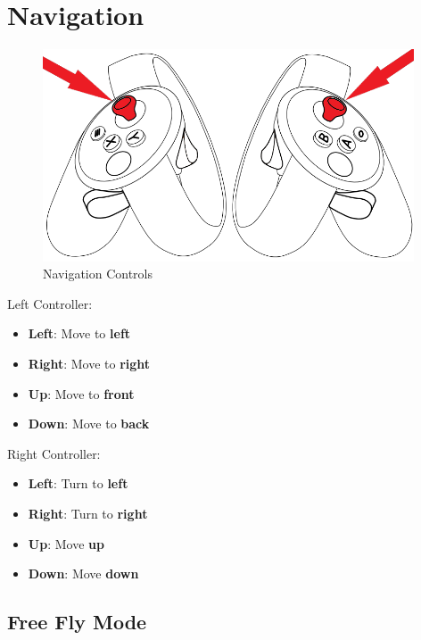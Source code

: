 \documentclass[notitlepage]{article}
\begin{document}
\section{Navigation}
\begin{figure}[H]
   \centering
	\includegraphics[width=11cm]{Controllers_sticks}%
    \caption{Navigation Controls}\label{fig:LeftRightSticks}%
\end{figure}

\begin{center}
\begin{varwidth}[t]{.5\textwidth}
Left Controller:
\begin{itemize}
\item \textbf{Left}: Move to \textbf{left}
\item \textbf{Right}: Move to \textbf{right}
\item \textbf{Up}: Move to \textbf{front}
\item \textbf{Down}: Move to \textbf{back}
\end{itemize}
\end{varwidth}%
\hspace{4em}%
\begin{varwidth}[t]{.5\textwidth}
Right Controller:
\begin{itemize}
\item \textbf{Left}: Turn to \textbf{left}
\item \textbf{Right}: Turn to \textbf{right}
\item \textbf{Up}: Move \textbf{up}
\item \textbf{Down}: Move \textbf{down}
\end{itemize}
\end{varwidth}
\end{center}

\qquad
\subsection{Free Fly Mode}
\end{document}
